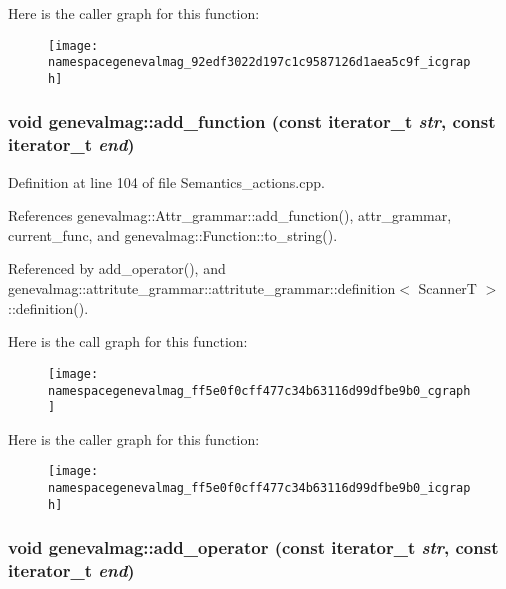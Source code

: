 Here is the caller graph for this function:\nopagebreak
\begin{figure}[H]
\begin{center}
\leavevmode
\texttt{[image: namespacegenevalmag\_92edf3022d197c1c9587126d1aea5c9f\_icgraph]}
\end{center}
\end{figure}
\hypertarget{namespacegenevalmag_ff5e0f0cff477c34b63116d99dfbe9b0}{
\subsubsection[{add\_\-function}]{\setlength{\rightskip}{0pt plus 5cm}void genevalmag::add\_\-function (const iterator\_\-t {\em str}, \/  const iterator\_\-t {\em end})}}
\label{namespacegenevalmag_ff5e0f0cff477c34b63116d99dfbe9b0}




Definition at line 104 of file Semantics\_\-actions.cpp.

References genevalmag::Attr\_\-grammar::add\_\-function(), attr\_\-grammar, current\_\-func, and genevalmag::Function::to\_\-string().

Referenced by add\_\-operator(), and genevalmag::attritute\_\-grammar::attritute\_\-grammar::definition$<$ ScannerT $>$::definition().

Here is the call graph for this function:\nopagebreak
\begin{figure}[H]
\begin{center}
\leavevmode
\texttt{[image: namespacegenevalmag\_ff5e0f0cff477c34b63116d99dfbe9b0\_cgraph]}
\end{center}
\end{figure}


Here is the caller graph for this function:\nopagebreak
\begin{figure}[H]
\begin{center}
\leavevmode
\texttt{[image: namespacegenevalmag\_ff5e0f0cff477c34b63116d99dfbe9b0\_icgraph]}
\end{center}
\end{figure}
\hypertarget{namespacegenevalmag_5651e2842c6f77725d4c10f46655ead4}{
\subsubsection[{add\_\-operator}]{\setlength{\rightskip}{0pt plus 5cm}void genevalmag::add\_\-operator (const iterator\_\-t {\em str}, \/  const iterator\_\-t {\em end})}}
\label{namespacegenevalmag_5651e2842c6f77725d4c10f46655ead4}


